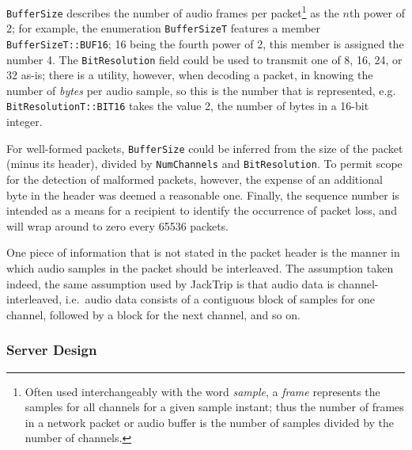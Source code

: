 \documentclass[utf8]{FrontiersinHarvard}
\begin{document}
    \texttt{BufferSize} describes the number of audio frames per packet\footnote{
        Often used interchangeably with the word \textit{sample}, a \textit{frame}
        represents the samples for all channels for a given sample instant;
        thus the number of frames in a network packet or audio buffer is the number
        of samples divided by the number of channels.
    } as the $n$th power of 2; for example, the enumeration \texttt{BufferSizeT}
    features a member \texttt{BufferSizeT::BUF16}; 16 being the fourth power of 2,
    this member is assigned the number 4.
    The \texttt{BitResolution} field could be used to transmit one of 8, 16, 24, or
    32 as-is; there is a utility, however, when decoding a packet, in knowing the
    number of \textit{bytes} per audio sample, so this is the number that is
    represented, e.g. \texttt{BitResolutionT::BIT16} takes the value 2, the number
    of bytes in a 16-bit integer.

    For well-formed packets, \texttt{BufferSize} could be inferred from the size of
    the packet (minus its header), divided by \texttt{NumChannels} and
    \texttt{BitResolution}.
    To permit scope for the detection of malformed packets, however, the expense
    of an additional byte in the header was deemed a reasonable one.
    Finally, the sequence number is intended as a means for a recipient to identify
    the occurrence of packet loss, and will wrap around to zero every \num{65536}
    packets.

    One piece of information that is not stated in the packet header is the manner
    in which audio samples in the packet should be interleaved.
    The assumption taken \textemdash{} indeed, the same assumption used by JackTrip
    \textemdash{} is that audio data is channel-interleaved, i.e.\ audio data
    consists of a contiguous block of samples for one channel, followed by a block
    for the next channel, and so on.

    \subsubsection{Server Design}
\end{document}
